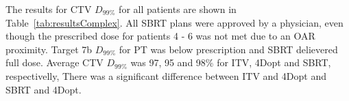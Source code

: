 The results for CTV $D_{99\%}$ for all patients are shown in Table~\ref{tab:resultsComplex}. All SBRT plans were approved by a physician, 
even though the prescribed dose for patients 4 - 6 was not met due to an OAR proximity. Target 7b $D_{99\%}$ for PT was below prescription and SBRT delievered full dose.
Average CTV $D_{99\%}$ was 97, 95 and 98\% for ITV, 4Dopt and SBRT, respectivelly, There was a significant difference between ITV and 4Dopt and SBRT and 4Dopt.


